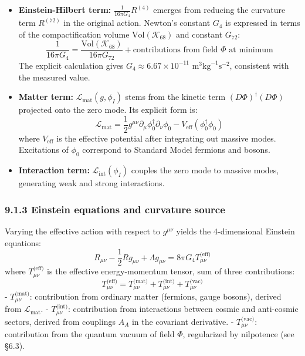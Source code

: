 \documentclass[11pt]{article}
\providecommand{\tightlist}{\setlength{\itemsep}{2pt}\setlength{\parskip}{6pt}}
\let\oldmathcal\mathcal
\renewcommand{\mathcal}[1]{\oldmathcal{#1}}
\providecommand{\tightlist}{%
  \setlength{\itemsep}{2pt}\setlength{\parskip}{6pt}
}
\begin{document}
\begin{itemize}
\tightlist
\item
  \textbf{Einstein-Hilbert term:} \(\frac{1}{16\pi G_4} R^{(4)}\)
  emerges from reducing the curvature term \(R^{(72)}\) in the original
  action. Newton's constant \(G_4\) is expressed in terms of the
  compactification volume \(\text{Vol}(\mathcal{K}_{68})\) and constant
  \(G_{72}\): \[
  \frac{1}{16\pi G_4} = \frac{\text{Vol}(\mathcal{K}_{68})}{16\pi G_{72}} + \text{contributions from field } \Phi \text{ at minimum}
  \] The explicit calculation gives
  \(G_4 \approx 6.67 \times 10^{-11} \text{ m}^3 \text{kg}^{-1} \text{s}^{-2}\),
  consistent with the measured value.
\item
  \textbf{Matter term:} \(\mathcal{L}_{\text{mat}}(g,\phi_I)\) stems
  from the kinetic term \((D\Phi)^\dagger(D\Phi)\) projected onto the
  zero mode. Its explicit form is: \[
  \mathcal{L}_{\text{mat}} = \frac{1}{2} g^{\mu\nu} \partial_\mu \phi_0^\dagger \partial_\nu \phi_0 - V_{\text{eff}}(\phi_0^\dagger \phi_0)
  \] where \(V_{\text{eff}}\) is the effective potential after
  integrating out massive modes. Excitations of \(\phi_0\) correspond to
  Standard Model fermions and bosons.
\item
  \textbf{Interaction term:} \(\mathcal{L}_{\text{int}}(\phi_I)\)
  couples the zero mode to massive modes, generating weak and strong
  interactions.
\end{itemize}

\hypertarget{einstein-equations-and-curvature-source}{%
\subsubsection{9.1.3 Einstein equations and curvature
source}\label{einstein-equations-and-curvature-source}}

Varying the effective action with respect to \(g^{\mu\nu}\) yields the
4-dimensional Einstein equations: \[
\boxed{ R_{\mu\nu} - \frac{1}{2} R g_{\mu\nu} + \Lambda g_{\mu\nu} = 8\pi G_4 T_{\mu\nu}^{\text{(eff)}} }
\] where \(T_{\mu\nu}^{\text{(eff)}}\) is the effective energy-momentum
tensor, sum of three contributions: \[
T_{\mu\nu}^{\text{(eff)}} = T_{\mu\nu}^{\text{(mat)}} + T_{\mu\nu}^{\text{(int)}} + T_{\mu\nu}^{\text{(vac)}}
\] - \(T_{\mu\nu}^{\text{(mat)}}\): contribution from ordinary matter
(fermions, gauge bosons), derived from \(\mathcal{L}_{\text{mat}}\). -
\(T_{\mu\nu}^{\text{(int)}}\): contribution from interactions between
cosmic and anti-cosmic sectors, derived from couplings \(A_A\) in the
covariant derivative. - \(T_{\mu\nu}^{\text{(vac)}}\): contribution from
the quantum vacuum of field \(\Phi\), regularized by nilpotence (see
§6.3).
\end{document}
